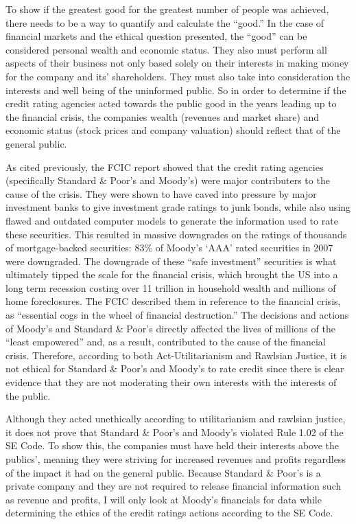 \documentclass[11pt]{article}
\begin{document}
\begin{multicols}{2}
To show if the greatest good for the greatest number of people was achieved, there needs to be a way to quantify and calculate the ``good.''  In the case of financial markets and the ethical question presented, the ``good'' can be considered personal wealth and economic status.  They also must perform all aspects of their business not only based solely on their interests in making money for the company and its' shareholders.  They must also take into consideration the interests and well being of the uninformed public.  So in order to determine if the credit rating agencies acted towards the public good in the years leading up to the financial crisis, the companies wealth (revenues and market share) and economic status (stock prices and company valuation) should reflect that of the general public.

As cited previously, the FCIC report showed that the credit rating agencies (specifically Standard \& Poor's and Moody's) were major contributers to the cause of the crisis. \cite{govtReport, huffCreditCause}  They were shown to have caved into pressure by major investment banks to give investment grade ratings to junk bonds, while also using flawed and outdated computer models to generate the information used to rate these securities. \cite[p.~xxv]{govtReport}  This resulted in massive downgrades on the ratings of thousands of mortgage-backed securities: 83\% of Moody's `AAA' rated securities in 2007 were downgraded. \cite[p.~xxv]{govtReport} The downgrade of these ``safe investment'' securities is what ultimately tipped the scale for the financial crisis, which brought the US into a long term recession costing over 11 trillion in household wealth and millions of home foreclosures. The FCIC described them in reference to the financial crisis, as ``essential cogs in the wheel of financial destruction.'' The decisions and actions of Moody's and Standard \& Poor's directly affected the lives of millions of the ``least empowered'' and, as a result, contributed to the cause of the financial crisis. Therefore, according to both Act-Utilitarianism and Rawlsian Justice, it is not ethical for Standard \& Poor's and Moody's to rate credit since there is clear evidence that they are not moderating their own interests with the interests of the public.

Although they acted unethically according to utilitarianism and rawlsian justice, it does not prove that Standard \& Poor's and Moody's violated Rule 1.02 of the SE Code.  To show this, the companies must have held their interests above the publics', meaning they were striving for increased revenues and profits regardless of the impact it had on the general public.  Because Standard \& Poor's is a private company and they are not required to release financial information such as revenue and profits, I will only look at Moody's financials for data while determining the ethics of the credit ratings actions according to the SE Code.


\end{multicols}
\end{document}
